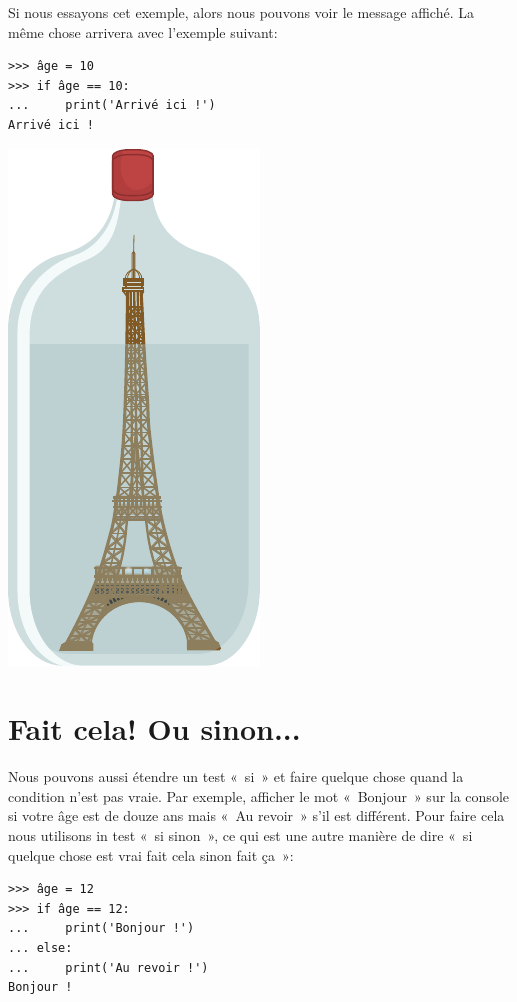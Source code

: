Si nous essayons cet exemple, alors nous pouvons voir le message affiché. La même chose arrivera avec l'exemple suivant:

\begin{Verbatim}[frame=single,rulecolor=\color{green}, label=à taper avec attention]
>>> âge = 10
>>> if âge == 10:
...     print('Arrivé ici !')
Arrivé ici !
\end{Verbatim}

\begin{center}
\includegraphics[scale=1]{images/paris.pdf}
\end{center}

\section{Fait cela! Ou sinon...}

Nous pouvons aussi étendre un test «~si~» et faire quelque chose quand la condition n'est pas vraie. Par exemple, afficher le mot «~Bonjour~» sur la console si votre âge est de douze ans mais «~Au revoir~»  s'il est différent. Pour faire cela nous utilisons in test «~si sinon~», ce qui est une autre manière de dire «~si quelque chose est vrai fait cela sinon fait ça~»:

\begin{Verbatim}[frame=single,rulecolor=\color{green}, label=à taper avec attention]
>>> âge = 12
>>> if âge == 12:
...     print('Bonjour !')
... else:
...     print('Au revoir !')
Bonjour !
\end{Verbatim}

